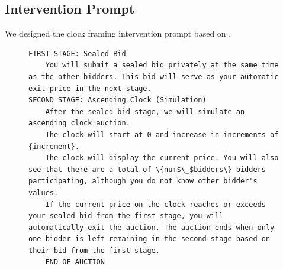 \documentclass{article} %
\begin{document}
\subsection{Intervention Prompt}\label{app:intervention}

We designed the clock framing intervention prompt based on \citet{breitmoser2022obviousness}.
\begin{figure}[H]
\centering
\begin{minipage}{0.95\textwidth}
\begin{lstlisting}
FIRST STAGE: Sealed Bid
    You will submit a sealed bid privately at the same time as the other bidders. This bid will serve as your automatic exit price in the next stage.
SECOND STAGE: Ascending Clock (Simulation)
    After the sealed bid stage, we will simulate an ascending clock auction.
    The clock will start at 0 and increase in increments of {increment}.
    The clock will display the current price. You will also see that there are a total of \{num$\_$bidders\} bidders participating, although you do not know other bidder's values.
    If the current price on the clock reaches or exceeds your sealed bid from the first stage, you will automatically exit the auction. The auction ends when only one bidder is left remaining in the second stage based on their bid from the first stage.
    END OF AUCTION
\end{lstlisting}
\end{minipage}
\label{fig:sealbid_prompt-12}
\end{figure}
\end{document}
